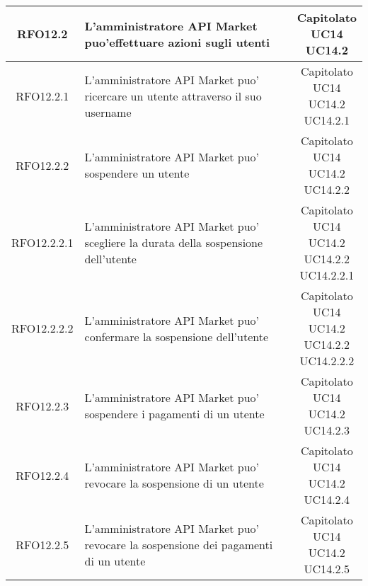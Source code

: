 \begin{longtable}{|c|p{8cm}|c|}
\hypertarget{RFO12.2}{RFO12.2} &  L'amministratore API Market puo'effettuare azioni sugli utenti& \makecell*{Capitolato\\UC14\\UC14.2} \\
\hline

\hypertarget{RFO12.2.1}{RFO12.2.1} &  L'amministratore API Market puo' ricercare un utente attraverso il suo username& \makecell*{Capitolato\\UC14\\UC14.2\\UC14.2.1} \\
\hline

\hypertarget{RFO12.2.2}{RFO12.2.2} &  L'amministratore API Market puo' sospendere un utente& \makecell*{Capitolato\\UC14\\UC14.2\\UC14.2.2} \\
\hline

\hypertarget{RFO12.2.2.1}{RFO12.2.2.1} &  L'amministratore API Market puo' scegliere la durata della sospensione dell'utente& \makecell*{Capitolato\\UC14\\UC14.2\\UC14.2.2\\UC14.2.2.1} \\
\hline

\hypertarget{RFO12.2.2.2}{RFO12.2.2.2} &  L'amministratore API Market puo' confermare la sospensione dell'utente& \makecell*{Capitolato\\UC14\\UC14.2\\UC14.2.2\\UC14.2.2.2} \\
\hline

\hypertarget{RFO12.2.3}{RFO12.2.3} &  L'amministratore API Market puo' sospendere i pagamenti di un utente& \makecell*{Capitolato\\UC14\\UC14.2\\UC14.2.3} \\
\hline

\hypertarget{RFO12.2.4}{RFO12.2.4} &  L'amministratore API Market puo' revocare la sospensione di un utente& \makecell*{Capitolato\\UC14\\UC14.2\\UC14.2.4} \\
\hline

\hypertarget{RFO12.2.5}{RFO12.2.5} &  L'amministratore API Market puo' revocare la sospensione dei pagamenti di un utente& \makecell*{Capitolato\\UC14\\UC14.2\\UC14.2.5} \\
\hline


\end{longtable}

